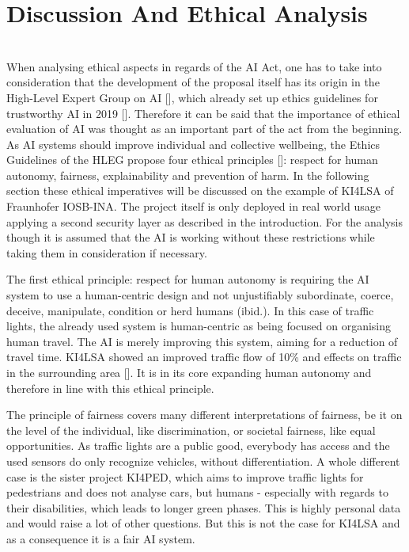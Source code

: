 \section{Discussion And Ethical Analysis}
  \\
  
  When analysing ethical aspects in regards of the AI Act, one has to take into consideration that the development of the proposal itself has its origin in the High-Level Expert Group on AI [\citet{HLEG_2019}], which already set up ethics guidelines for trustworthy AI in 2019 [\citet{ai_act}]. Therefore it can be said that the importance of ethical evaluation of AI was thought as an important part of the act from the beginning. \\
  
As AI systems should improve individual and collective wellbeing, the Ethics Guidelines of the HLEG propose four ethical principles [\citet{HLEG_2019}]: respect for human autonomy, fairness, explainability and prevention of harm. In the following section these ethical imperatives will be discussed on the example of KI4LSA of Fraunhofer IOSB-INA. The project itself is only deployed in real world usage applying a second security layer as described in the introduction. For the analysis though it is assumed that the AI is working without these restrictions while taking them in consideration if necessary.

The first ethical principle: respect for human autonomy is requiring the AI system to use a human-centric design and not unjustifiably subordinate, coerce, deceive, manipulate, condition or herd humans (ibid.). In this case of traffic lights, the already used system is human-centric as being focused on organising human travel. The AI is merely improving this system, aiming for a reduction of travel time. KI4LSA showed an improved traffic flow of 10\%
and effects on traffic in the surrounding area [\citet{KI4LSA_presentation}].  It is in its core expanding human autonomy and therefore in line with this ethical principle.

The principle of fairness covers many different interpretations of fairness, be it on the level of the individual, like discrimination, or societal fairness, like equal opportunities. As traffic lights are a public good, everybody has access and the used sensors do only recognize vehicles, without differentiation. A whole different case is the sister project KI4PED, which aims to improve traffic lights for pedestrians and does not analyse cars, but humans - especially with regards to their disabilities, which leads to longer green phases. This is highly personal data and would raise a lot of other questions. But this is not the case for KI4LSA and as a consequence it is a fair AI system.

